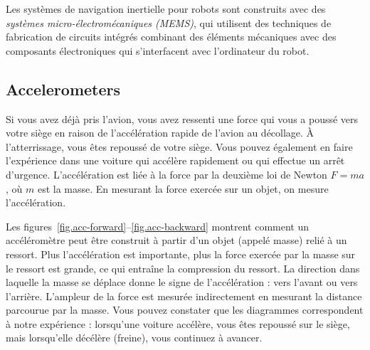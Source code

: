 Les systèmes de navigation inertielle pour robots sont construits avec des \emph{systèmes micro-électromécaniques (MEMS)}, qui utilisent des techniques de fabrication de circuits intégrés combinant des éléments mécaniques avec des composants électroniques qui s'interfacent avec l'ordinateur du robot.

\subsection{Accelerometers}\label{s.accelerometer}

Si vous avez déjà pris l'avion, vous avez ressenti une force qui vous a poussé vers votre siège en raison de l'accélération rapide de l'avion au décollage. À l'atterrissage, vous êtes repoussé de votre siège. Vous pouvez également en faire l'expérience dans une voiture qui accélère rapidement ou qui effectue un arrêt d'urgence. L'accélération est liée à la force par la deuxième loi de Newton $F=ma$, où $m$ est la masse. En mesurant la force exercée sur un objet, on mesure l'accélération.

Les figures~\ref{fig.acc-forward}--\ref{fig.acc-backward} montrent comment un accéléromètre peut être construit à partir d'un objet (appelé masse) relié à un ressort. Plus l'accélération est importante, plus la force exercée par la masse sur le ressort est grande, ce qui entraîne la compression du ressort. La direction dans laquelle la masse se déplace donne le signe de l'accélération : vers l'avant ou vers l'arrière. L'ampleur de la force est mesurée indirectement en mesurant la distance parcourue par la masse. Vous pouvez constater que les diagrammes correspondent à notre expérience : lorsqu'une voiture accélère, vous êtes repoussé sur le siège, mais lorsqu'elle décélère (freine), vous continuez à avancer.

